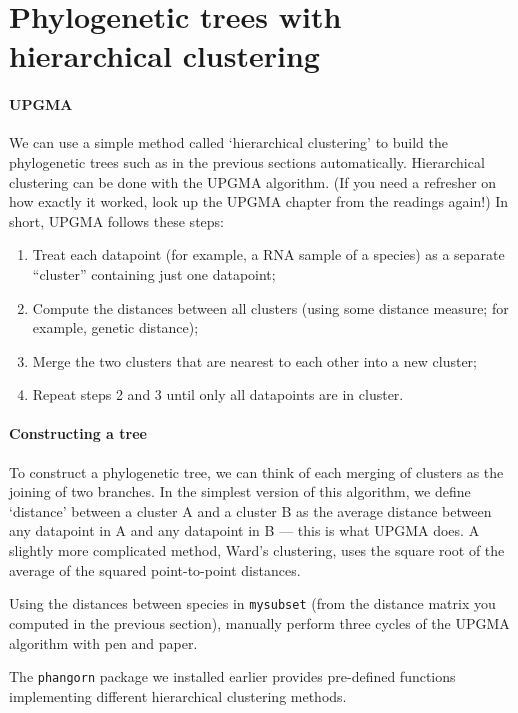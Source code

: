 \documentclass[a4paper, 9pt]{article}
\begin{document}
\section{Phylogenetic trees with hierarchical clustering}
\paragraph{UPGMA} We can use a simple method called `hierarchical clustering' to build the phylogenetic trees such as in the previous sections automatically. Hierarchical clustering can be done with the UPGMA algorithm. (If you need a refresher on how exactly it worked, look up the UPGMA chapter from the readings again!)
In short, UPGMA follows these steps:
\begin{enumerate}
\item Treat each datapoint (for example, a RNA sample of a species) as a separate ``cluster'' containing just one datapoint;
\item Compute the distances between all clusters (using some distance measure; for example, genetic distance);
\item Merge the two clusters that are nearest to each other into a new cluster;
\item Repeat steps 2 and 3 until only all datapoints are in cluster. 
\end{enumerate}

\paragraph{Constructing a tree} To construct a phylogenetic tree, we can think of each merging of
clusters as the joining of two branches. In the simplest version of this
algorithm, we define `distance' between a cluster A and a cluster B as
the average distance between any datapoint in A and any datapoint in B --- this is what UPGMA does. A slightly more complicated method, Ward's clustering, uses the square root of the average of the squared point-to-point distances.

\begin{exercise}
    \askstar Using the distances between species in \texttt{mysubset} (from the distance matrix you computed in the previous section), manually perform three cycles of the UPGMA algorithm with pen and paper.
\end{exercise}

The \texttt{phangorn} package we installed earlier provides pre-defined
functions implementing different hierarchical clustering methods.
\end{document}
